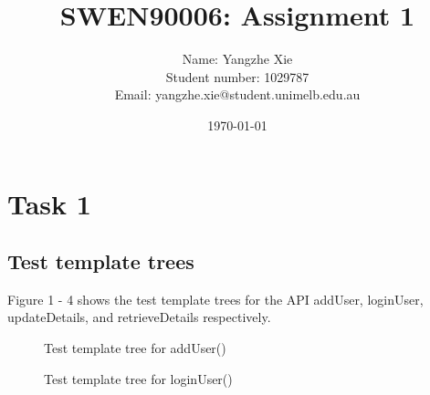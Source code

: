 \documentclass{article}
\title{SWEN90006: Assignment 1}
\author{Name: Yangzhe Xie\\Student number: 1029787\\Email: yangzhe.xie@student.unimelb.edu.au}
\date{\today}
\begin{document}
\maketitle
\thispagestyle{fancy}

\section{Task 1}
\subsection{Test template trees}
Figure 1 - 4 shows the test template trees for the API addUser, loginUser, updateDetails, and retrieveDetails respectively.
\begin{figure}[hbt!]        
\caption{\label{1} Test template tree for addUser()}      
\end{figure}
\begin{figure}[hbt!]        
\caption{\label{1} Test template tree for loginUser()}      
\end{figure}
\end{document}
